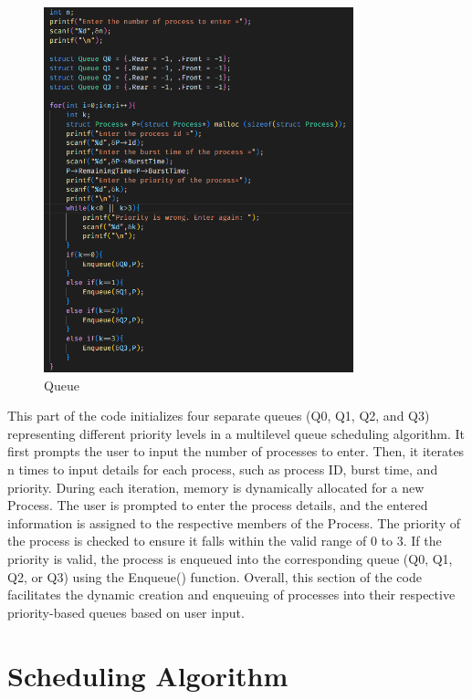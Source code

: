 \documentclass{article}
\begin{document}
\vspace{\baselineskip}
\begin{figure}[h!]
    \centering
    \includegraphics[width=0.8\textwidth]{4.png}
    \caption{Queue}
    \label{fig:ne}
\end{figure}

\newpage
This part of the code initializes four separate queues (Q0, Q1, Q2, and Q3) representing different priority levels in a multilevel queue scheduling algorithm. It first prompts the user to input the number of processes to enter. Then, it iterates n times to input details for each process, such as process ID, burst time, and priority.
During each iteration, memory is dynamically allocated for a new Process. The user is prompted to enter the process details, and the entered information is assigned to the respective members of the Process.
The priority of the process is checked to ensure it falls within the valid range of 0 to 3. If the priority is valid, the process is enqueued into the corresponding queue (Q0, Q1, Q2, or Q3) using the Enqueue() function.
Overall, this section of the code facilitates the dynamic creation and enqueuing of processes into their respective priority-based queues based on user input.

\vspace{\baselineskip}
\section{Scheduling Algorithm}
\vspace{\baselineskip}
\end{document}
